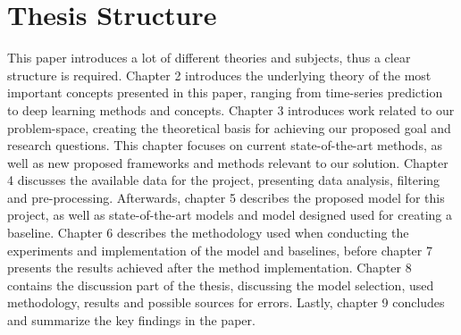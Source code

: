 
\section{Thesis Structure}
\label{sections:Introduction:Structure}

This paper introduces a lot of different theories and subjects,
thus a clear structure is required.
Chapter 2 introduces the underlying theory of the most important concepts presented in this paper,
ranging from time-series prediction to deep learning methods and concepts.
Chapter 3 introduces work related to our problem-space, creating the theoretical basis for achieving our proposed goal and research questions.
This chapter focuses on current state-of-the-art methods,
as well as new proposed frameworks and methods relevant to our solution.
Chapter 4 discusses the available data for the project, presenting data analysis, filtering and pre-processing.
Afterwards, chapter 5 describes the proposed model for this project, as well as state-of-the-art models and model designed used for creating a baseline.
Chapter 6 describes the methodology used when conducting the experiments and implementation of the model and baselines,
before chapter 7 presents the results achieved after the method implementation.
Chapter 8 contains the discussion part of the thesis, discussing the model selection, used methodology, results and possible sources for errors.
Lastly, chapter 9 concludes and summarize the key findings in the paper.



\iffalse
This paper introduces a lot of different theories and subjects,
thus a clear structure is required.
Chapter 2 introduces the underlying theory of the most important concepts presented in this paper,
ranging from time-series prediction to deep learning methods and concepts.
Chapter 3 introduces work related to our problem-space, creating the theoretical basis for achieving our proposed goal and research questions.
This chapter focuses on current state-of-the-art methods,
as well as new proposed frameworks and methods relevant to our solution.
Chapter 4 introduces our proposed method and architecture,
presenting the model framework and model structure.
Lastly, chapter 5 supplies an evaluation and discussion of the proposed framework regarding our proposed research questions and goal.
\fi

